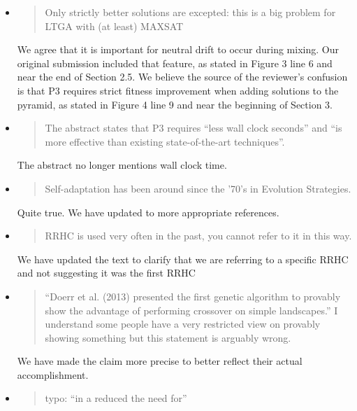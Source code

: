 \documentclass[]{article}
\begin{document}
\begin{itemize}
\item
\begin{quote}
Only strictly better solutions are excepted: this is a big problem for LTGA with (at least) MAXSAT
\end{quote}

We agree that it is important for neutral drift to occur during mixing. Our original submission included that feature,
as stated in Figure 3 line 6 and near the end of Section 2.5. We believe the source of the reviewer's confusion is that P3
requires strict fitness improvement when adding solutions to the pyramid, as stated in Figure 4 line 9 and near the beginning
of Section 3.

\item
\begin{quote}
The abstract states that P3 requires ``less wall clock seconds'' and ``is more effective than existing state-of-the-art techniques''.
\end{quote}

The abstract no longer mentions wall clock time.

\item
\begin{quote}
 Self-adaptation has been around since the '70's in Evolution Strategies.
\end{quote}

Quite true. We have updated to more appropriate references.

\item
\begin{quote}
RRHC is used very often in the past, you cannot refer to it in this way.
\end{quote}

We have updated the text to clarify that we are referring to a specific RRHC and not suggesting it was the first RRHC

\item
\begin{quote}
``Doerr et al. (2013) presented the first genetic algorithm to provably show the advantage of performing crossover on simple landscapes.''
I understand some people have a very restricted view on provably showing something but this statement is arguably wrong.
\end{quote}

We have made the claim more precise to better reflect their actual accomplishment.

\item
\begin{quote}
typo:  ``in a reduced the need for''
\end{quote}


\end{itemize}
\end{document}
